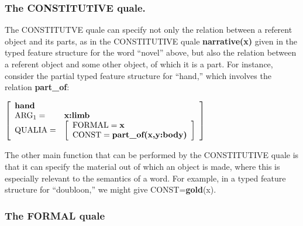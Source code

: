 \documentclass[12pt]{amsart}
\begin{document}
\subsubsection{The CONSTITUTIVE quale.}

The CONSTITUTVE quale can specify not only the relation between a referent object and its parts, as in the CONSTITUTIVE quale {\bf narrative(x)} given in the typed feature structure for the word ``novel'' above, but also the relation between a referent object and some other object, of which it is a part.  For instance, consider the partial typed feature structure for ``hand,'' which involves the relation {\bf part\_of}:
\par\vspace{5mm}
$\left[
\begin{array}{l l}
\textbf{hand} & \\
\text{ARG}_1 = & \textbf{x:limb} \\

\text{QUALIA} = & \left[ \begin{array}{l}
				\text{FORMAL}=\textbf{x} \\
				\text{CONST}=\textbf{part\_of(x,y:body)} \\
				\end{array}\right] \\
\end{array}
\right]$
\par\vspace{5mm}

The other main function that can be performed by the CONSTITUTIVE quale is that it can specify the material out of which an object is made, where this is especially relevant to the semantics of a word. For example, in a typed feature structure for ``doubloon,'' we might give CONST={\bf gold}(x).

\subsubsection{The FORMAL quale}
\end{document}
